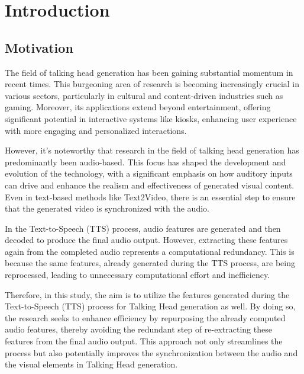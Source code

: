 \chapter{Introduction}
\label{chap:introduction}

\section{Motivation}
\label{sec:motivation}
The field of talking head generation has been gaining substantial momentum in recent times.
This burgeoning area of research is becoming increasingly crucial in various sectors, particularly in cultural and content-driven industries such as gaming.
Moreover, its applications extend beyond entertainment, offering significant potential in interactive systems like kiosks, enhancing user experience with more engaging and personalized interactions.

However, it's noteworthy that research in the field of talking head generation has predominantly been audio-based. \cite{wav2lip, makeitalk}
This focus has shaped the development and evolution of the technology, with a significant emphasis on how auditory inputs can drive and enhance the realism and effectiveness of generated visual content.
Even in text-based methods like Text2Video\cite{Text2Video}, there is an essential step to ensure that the generated video is synchronized with the audio.

In the Text-to-Speech (TTS) process, audio features are generated and then decoded to produce the final audio output.\cite{Fastspeech2, Vall-E-X}
However, extracting these features again from the completed audio represents a computational redundancy.
This is because the same features, already generated during the TTS process, are being reprocessed, leading to unnecessary computational effort and inefficiency.

Therefore, in this study, the aim is to utilize the features generated during the Text-to-Speech (TTS) process for Talking Head generation as well.
By doing so, the research seeks to enhance efficiency by repurposing the already computed audio features, thereby avoiding the redundant step of re-extracting these features from the final audio output.
This approach not only streamlines the process but also potentially improves the synchronization between the audio and the visual elements in Talking Head generation.


